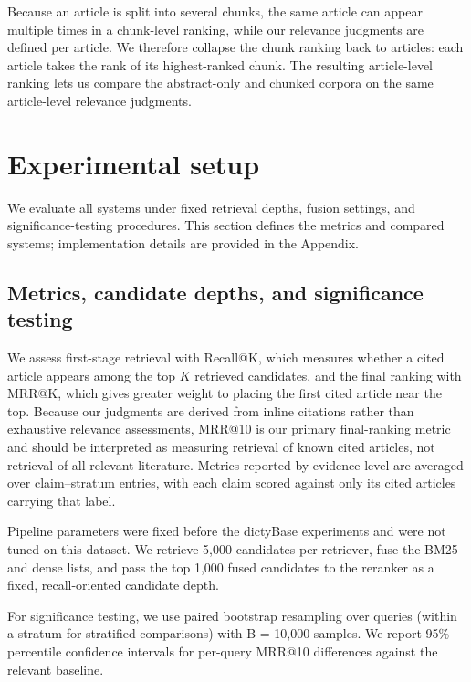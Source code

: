 \documentclass[runningheads]{llncs}
\begin{document}
Because an article is split into several chunks, the same article can appear multiple times in a chunk-level ranking, while our relevance judgments are defined per article. We therefore collapse the chunk ranking back to articles: each article takes the rank of its highest-ranked chunk. The resulting article-level ranking lets us compare the abstract-only and chunked corpora on the same article-level relevance judgments.

\FloatBarrier
\section{Experimental setup}
\label{sec:experimental_setup}

We evaluate all systems under fixed retrieval depths, fusion settings, and significance-testing procedures. This section defines the metrics and compared systems; implementation details are provided in the Appendix.

\subsection{Metrics, candidate depths, and significance testing}
\label{sec:metrics_significance}
We assess first-stage retrieval with Recall@K, which measures whether a cited article appears among the top $K$ retrieved candidates, and the final ranking with MRR@K, which gives greater weight to placing the first cited article near the top. Because our judgments are derived from inline citations rather than exhaustive relevance assessments, MRR@10 is our primary final-ranking metric and should be interpreted as measuring retrieval of known cited articles, not retrieval of all relevant literature. Metrics reported by evidence level are averaged over claim--stratum entries, with each claim scored against only its cited articles carrying that label.

Pipeline parameters were fixed before the dictyBase experiments and were not tuned on this dataset. We retrieve 5,000 candidates per retriever, fuse the BM25 and dense lists, and pass the top 1,000 fused candidates to the reranker as a fixed, recall-oriented candidate depth.

For significance testing, we use paired bootstrap resampling over queries (within a stratum for stratified comparisons) with B = 10,000 samples. We report 95\% percentile confidence intervals for per-query MRR@10 differences against the relevant baseline.
\end{document}
